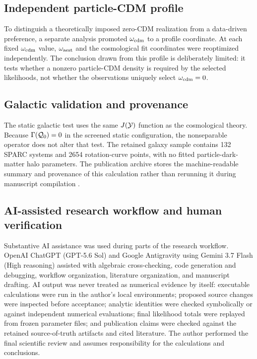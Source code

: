\subsection{Independent particle-CDM profile}
To distinguish a theoretically imposed zero-CDM realization from a data-driven preference, a separate analysis promoted $\omega_{\rm cdm}$ to a profile coordinate. At each fixed $\omega_{\rm cdm}$ value, $\omega_{\rm aest}$ and the cosmological fit coordinates were reoptimized independently. The conclusion drawn from this profile is deliberately limited: it tests whether a nonzero particle-CDM density is required by the selected likelihoods, not whether the observations uniquely select $\omega_{\rm cdm}=0$.

\subsection{Galactic validation and provenance}
The static galactic test uses the same $J(\mathcal{Y})$ function as the cosmological theory. Because $\Gamma(\mathcal{Q}_0)=0$ in the screened static configuration, the nonseparable operator does not alter that test. The retained galaxy sample contains 132 SPARC systems and 2654 rotation-curve points, with no fitted particle-dark-matter halo parameters. The publication archive stores the machine-readable summary and provenance of this calculation rather than rerunning it during manuscript compilation \cite{LelliMcGaughSchombert2016}.

\subsection{AI-assisted research workflow and human verification}
Substantive AI assistance was used during parts of the research workflow. OpenAI ChatGPT (GPT-5.6 Sol) and Google Antigravity using Gemini 3.7 Flash (High reasoning) assisted with algebraic cross-checking, code generation and debugging, workflow organization, literature organization, and manuscript drafting. AI output was never treated as numerical evidence by itself: executable calculations were run in the author's local environments; proposed source changes were inspected before acceptance; analytic identities were checked symbolically or against independent numerical evaluations; final likelihood totals were replayed from frozen parameter files; and publication claims were checked against the retained source-of-truth artifacts and cited literature. The author performed the final scientific review and assumes responsibility for the calculations and conclusions.

